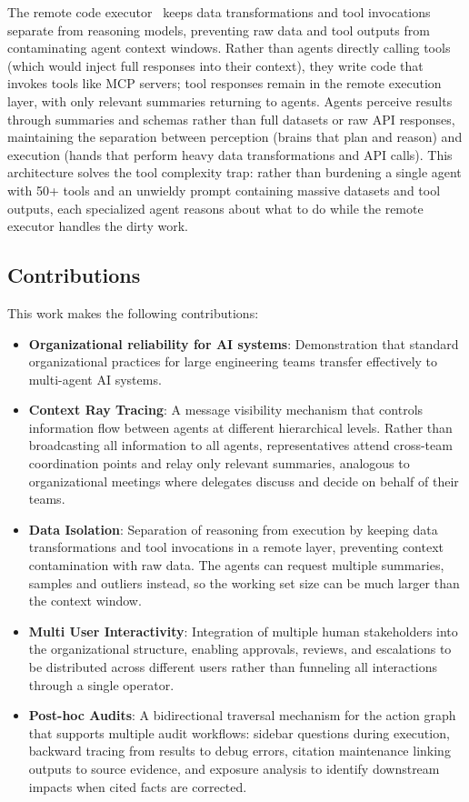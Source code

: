 \documentclass[sigconf]{acmart}
\begin{document}
The remote code executor~\cite{Mei2024AIOS} keeps data transformations and tool invocations separate from reasoning models, preventing raw data and tool outputs from contaminating agent context windows. Rather than agents directly calling tools (which would inject full responses into their context), they write code that invokes tools like MCP servers; tool responses remain in the remote execution layer, with only relevant summaries returning to agents. Agents perceive results through summaries and schemas rather than full datasets or raw API responses, maintaining the separation between perception (brains that plan and reason) and execution (hands that perform heavy data transformations and API calls). This architecture solves the tool complexity trap: rather than burdening a single agent with 50+ tools and an unwieldy prompt containing massive datasets and tool outputs, each specialized agent reasons about what to do while the remote executor handles the dirty work.

\subsection{Contributions}

This work makes the following contributions:

\begin{itemize}
  \item \textbf{Organizational reliability for AI systems}: Demonstration that standard organizational practices for large engineering teams transfer effectively to multi-agent AI systems.
  \item \textbf{Context Ray Tracing}: A message visibility mechanism that controls information flow between agents at different hierarchical levels. Rather than broadcasting all information to all agents, representatives attend cross-team coordination points and relay only relevant summaries, analogous to organizational meetings where delegates discuss and decide on behalf of their teams.
  \item \textbf{Data Isolation}: Separation of reasoning from execution by keeping data transformations and tool invocations in a remote layer, preventing context contamination with raw data. The agents can request multiple summaries, samples and outliers instead, so the working set size can be much larger than the context window.
  \item \textbf{Multi User Interactivity}: Integration of multiple human stakeholders into the organizational structure, enabling approvals, reviews, and escalations to be distributed across different users rather than funneling all interactions through a single operator.
  \item \textbf{Post-hoc Audits}: A bidirectional traversal mechanism for the action graph that supports multiple audit workflows: sidebar questions during execution, backward tracing from results to debug errors, citation maintenance linking outputs to source evidence, and exposure analysis to identify downstream impacts when cited facts are corrected.
\end{itemize}
\end{document}
